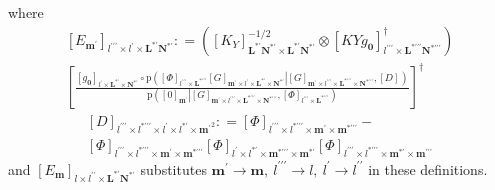 \documentclass[preprint,12pt]{elsarticle}
\newcommand*{\M}[1]{\ensuremath{#1}\xspace}
\newcommand*{\x}{\times}
\newcommand*{\mi}[1]{\mathbf{#1}}
\newcommand*{\te}[2][]{\left\lbrack{#2}\right\rbrack_{#1}}
\newcommand*{\prob}[3]{\M{\mathrm{p}\!\left(\left.{#1}\right\vert{#2,#3}\right)}}
\newcommand*{\deq}{\M{\mathrel{\mathop:}=}}
\begin{document}
        where
        \begin{multline*}
            \te[l^{\prime\prime\prime}\x l^{\prime}\x \mi{L^{*\prime}N^{*\prime}}]{E_{\mi{m^{\prime}}}} \deq 
            \left(
                \te[\mi{L^{*\prime}N^{*\prime}}\x\mi{L^{*\prime}N^{*\prime}}]{K_{Y}}^{-1/2} \otimes \te[l^{\prime\prime\prime}\x\mi{L^{*\prime\prime\prime}N^{*\prime\prime\prime}}]{KY\!g_{\mi{0}}}^{\dagger} \right) \\
            \left\lbrack\frac{
            \te[l^{\prime}\x\mi{L^{*\prime}}\x\mi{N^{*\prime}}]{g_{\mi{0}}} \circ
            \prob
            {\te[l^{\prime\prime\prime}\x \mi{L^{*\prime\prime\prime}}]{\Phi} 
            \te[\mi{m^{\prime}}\x l^{\prime}\x \mi{L^{*\prime}\x N^{*\prime}}]{G}}
            {\te[\mi{m^{\prime}}\x l^{\prime\prime\prime}\x \mi{L^{*\prime\prime\prime}\x N^{*\prime\prime\prime}}]{G}}
            {\te[]{D}}}
            {\prob{\te[\mi{m^{\prime}}]{0}}{\te[\mi{m^{\prime}}\x l^{\prime\prime\prime}\x \mi{L^{*\prime\prime\prime}\x N^{*\prime\prime\prime}}]{G}}{\te[l^{\prime\prime\prime}\x \mi{L^{*\prime\prime\prime}}]{\Phi}}} \right\rbrack^{\dagger}
        \end{multline*}
        \begin{multline*}
            \te[l^{\prime\prime\prime} \x l^{*\prime\prime\prime}\x l^{\prime}\x l^{*\prime}\x\mi{m^{\prime}}^{2}]{D} \deq \te[l^{\prime\prime\prime}\x l^{*\prime\prime\prime}\x\mi{m^{\prime}}\x\mi{m^{*\prime\prime\prime}}]{\Phi} -  \\ 
            \te[l^{\prime\prime\prime}\x l^{*\prime\prime\prime}\x\mi{m^{\prime}}\x\mi{m^{*\prime\prime\prime}}]{\Phi}
            \te[l^{\prime}\x l^{*\prime}\x\mi{m^{*\prime\prime\prime}}\x\mi{m^{*\prime}}]{\Phi}
            \te[l^{\prime\prime\prime}\x l^{*\prime\prime\prime}\x\mi{m^{*\prime}}\x\mi{m^{\prime\prime\prime}}]{\Phi}
        \end{multline*}
        and $\te[l\x l^{\prime\prime}\x \mi{L^{*\prime}N^{*\prime}}]{E_{\mi{m}}}$ substitutes $\mi{m^{\prime}}\rightarrow\mi{m},\ l^{\prime\prime\prime}\rightarrow l,\ l^{\prime}\rightarrow l^{\prime\prime}$ in these definitions.

        
\end{document}
